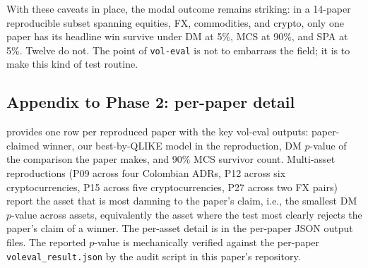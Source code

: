 With these caveats in place, the modal outcome remains striking: in a 14-paper reproducible subset spanning equities, FX, commodities, and crypto, only one paper has its headline win survive under DM at 5\%, MCS at 90\%, and SPA at 5\%. Twelve do not. The point of \texttt{vol-eval} is not to embarrass the field; it is to make this kind of test routine.

\subsection{Appendix to Phase 2: per-paper detail}\label{sec:phase2_appendix_text}

 provides one row per reproduced paper with the key vol-eval outputs: paper-claimed winner, our best-by-QLIKE model in the reproduction, DM $p$-value of the comparison the paper makes, and 90\% MCS survivor count. Multi-asset reproductions (P09 across four Colombian ADRs, P12 across six cryptocurrencies, P15 across five cryptocurrencies, P27 across two FX pairs) report the asset that is most damning to the paper's claim, i.e., the smallest DM $p$-value across assets, equivalently the asset where the test most clearly rejects the paper's claim of a winner. The per-asset detail is in the per-paper JSON output files. The reported $p$-value is mechanically verified against the per-paper \texttt{voleval\_result.json} by the audit script in this paper's repository.

